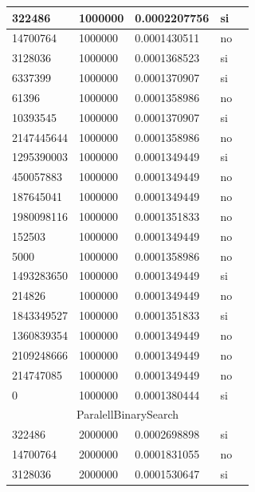 \documentclass[12pt, fleqn]{article}                             %
\theoremstyle{break}                                            %
\begin{document}
\begin{longtable}{|m{5em}|m{5em}|m{10em}|m{5em}|@{}m{0pt}@{}}
            322486& 1000000  & 0.0002207756 & si &\\[1em]    \hline
            14700764& 1000000  & 0.0001430511 & no &\\[1em]    \hline
            3128036& 1000000  & 0.0001368523 & si &\\[1em]    \hline
            6337399& 1000000  & 0.0001370907 & si &\\[1em]    \hline
            61396& 1000000  & 0.0001358986 & no &\\[1em]    \hline
            10393545& 1000000  & 0.0001370907 & si &\\[1em]    \hline
            2147445644& 1000000  & 0.0001358986 & no &\\[1em]    \hline
            1295390003& 1000000  & 0.0001349449 & si &\\[1em]    \hline
            450057883& 1000000  & 0.0001349449 & no &\\[1em]    \hline
            187645041& 1000000  & 0.0001349449 & no &\\[1em]    \hline
            1980098116& 1000000  & 0.0001351833 & no &\\[1em]    \hline
            152503& 1000000  & 0.0001349449 & no &\\[1em]    \hline
            5000& 1000000  & 0.0001358986 & no &\\[1em]    \hline
            1493283650& 1000000  & 0.0001349449 & si &\\[1em]    \hline
            214826& 1000000  & 0.0001349449 & no &\\[1em]    \hline
            1843349527& 1000000  & 0.0001351833 & si &\\[1em]    \hline
            1360839354& 1000000  & 0.0001349449 & no &\\[1em]    \hline
            2109248666& 1000000  & 0.0001349449 & no &\\[1em]    \hline
            214747085& 1000000  & 0.0001349449 & no &\\[1em]    \hline
            0& 1000000  & 0.0001380444 & si &\\[1em]    \hline
            \multicolumn{5}{|c|}{ParalellBinarySearch}   \\          \hline
            322486& 2000000  & 0.0002698898 & si &\\[1em]    \hline
            14700764& 2000000  & 0.0001831055 & no &\\[1em]    \hline
            3128036& 2000000  & 0.0001530647 & si &\\[1em]    \hline

\end{longtable}
\end{document}
